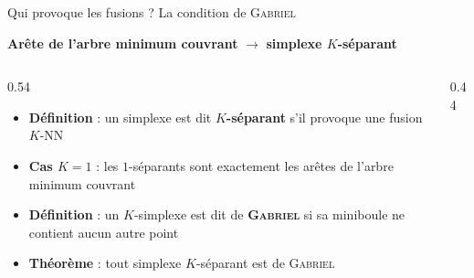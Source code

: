 \begin{frame}{Qui provoque les fusions ? La condition de \textsc{Gabriel}}
    \begin{center}
        \large \textbf{Arête de l'arbre minimum couvrant} $\longrightarrow$ \textbf{simplexe $K$-séparant}
    \end{center}

    \vspace{0.2cm}
    \begin{columns}[c, onlytextwidth]
        \begin{column}{0.54\textwidth}
            \begin{itemize}
                \setlength{\itemsep}{12pt}
                \item \textbf{Définition}  : un simplexe est dit \textbf{$K$-séparant} s'il
                provoque une fusion $K$-NN
                \item \textbf{Cas $K=1$} : les $1$-séparants sont exactement les arêtes de l'arbre minimum couvrant
                \item \textbf{Définition}  : un $K$-simplexe est dit de \textbf{\textsc{Gabriel}}
                si sa miniboule ne contient aucun autre point
                \item \textbf{Théorème}  : tout simplexe $K$-séparant est de \textsc{Gabriel}
            \end{itemize}
        \end{column}

        \begin{column}{0.44\textwidth}
            \begin{center}
                
            \end{center}
        \end{column}
    \end{columns}
\end{frame}

